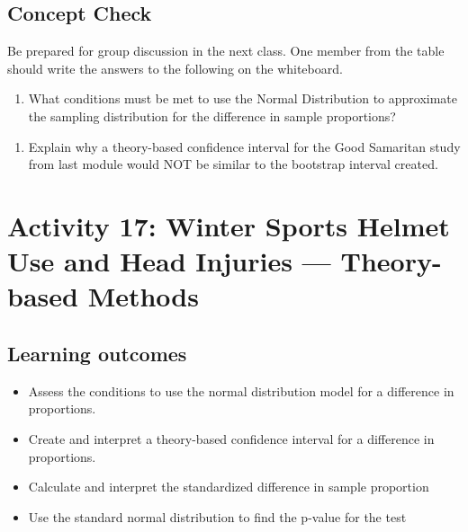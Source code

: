 \documentclass[
]{report}
\providecommand{\tightlist}{%
  \setlength{\itemsep}{0pt}\setlength{\parskip}{0pt}}
\begin{document}
\vspace{0.8in}

\subsection{Concept Check}\label{concept-check-7}

Be prepared for group discussion in the next class. One member from the table should write the answers to the following on the whiteboard.

\begin{enumerate}
\def\labelenumi{\arabic{enumi}.}
\tightlist
\item
  What conditions must be met to use the Normal Distribution to approximate the sampling distribution for the difference in sample proportions?
\end{enumerate}

\vspace{0.6in}

\begin{enumerate}
\def\labelenumi{\arabic{enumi}.}
\setcounter{enumi}{1}
\tightlist
\item
  Explain why a theory-based confidence interval for the Good Samaritan study from last module would NOT be similar to the bootstrap interval created.
\end{enumerate}

\vspace{1in}

\newpage

\section{Activity 17: Winter Sports Helmet Use and Head Injuries --- Theory-based Methods}\label{activity-17-winter-sports-helmet-use-and-head-injuries-theory-based-methods}


\subsection{Learning outcomes}\label{learning-outcomes-18}

\begin{itemize}
\item
  Assess the conditions to use the normal distribution model for a difference in proportions.
\item
  Create and interpret a theory-based confidence interval for a difference in proportions.
\item
  Calculate and interpret the standardized difference in sample proportion
\item
  Use the standard normal distribution to find the p-value for the test
\end{itemize}
\end{document}
